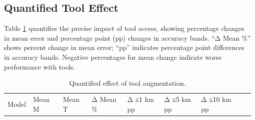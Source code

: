 \subsection{Quantified Tool
Effect}\label{d.2-quantified-tool-effect}

Table \ref{tbl:tool_effect} quantifies the precise impact of tool
access, showing percentage changes in mean error and percentage point
(pp) changes in accuracy bands. ``Δ Mean \%'' shows percent change in
mean error; ``pp'' indicates percentage point differences in accuracy
bands. Negative percentages for mean change indicate worse performance
with tools.

\begin{longtable}[]{@{}
  >{\raggedright\arraybackslash}p{}
  >{\raggedright\arraybackslash}p{}
  >{\raggedright\arraybackslash}p{}
  >{\raggedright\arraybackslash}p{}
  >{\raggedright\arraybackslash}p{}
  >{\raggedright\arraybackslash}p{}
  >{\raggedright\arraybackslash}p{}
  >{\raggedright\arraybackslash}p{}
  >{\raggedright\arraybackslash}p{}@{}}
\caption{\label{tbl:tool_effect}Quantified effect of tool
augmentation.}\tabularnewline
\toprule\noalign{}
\begin{minipage}[b]{\linewidth}\raggedright
Model
\end{minipage} & \begin{minipage}[b]{\linewidth}\raggedright
Mean M
\end{minipage} & \begin{minipage}[b]{\linewidth}\raggedright
Mean T
\end{minipage} & \begin{minipage}[b]{\linewidth}\raggedright
Δ Mean \%
\end{minipage} & \begin{minipage}[b]{\linewidth}\raggedright
Δ ≤1 km pp
\end{minipage} & \begin{minipage}[b]{\linewidth}\raggedright
Δ ≤5 km pp
\end{minipage} & \begin{minipage}[b]{\linewidth}\raggedright
Δ ≤10 km pp
\end{minipage} & \begin{minipage}[b]{\linewidth}\raggedright

\end{minipage}
\end{longtable}

